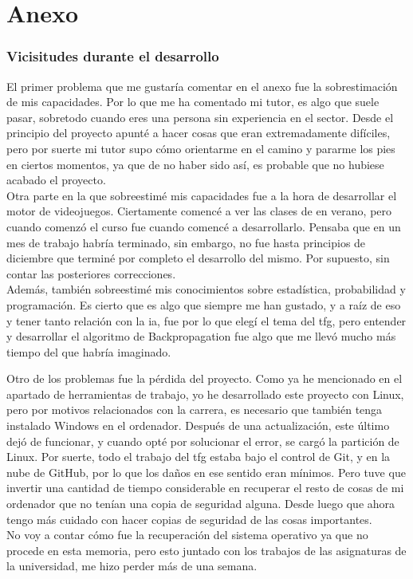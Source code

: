 
\chapter{Anexo}
\subsection{Vicisitudes durante el desarrollo}
El primer problema que me gustaría comentar en el anexo fue la sobrestimación de mis capacidades. Por lo que me ha comentado mi tutor, es algo que suele pasar, sobretodo cuando eres una persona sin experiencia en el sector. Desde el principio del proyecto apunté a hacer cosas que eran extremadamente difíciles, pero por suerte mi tutor supo cómo orientarme en el camino y pararme los pies en ciertos momentos, ya que de no haber sido así, es probable que no hubiese acabado el proyecto. 
\\
Otra parte en la que sobreestimé mis capacidades fue a la hora de desarrollar el motor de videojuegos. Ciertamente comencé a ver las clases de \cite{CursoMotorC++} en verano, pero cuando comenzó el curso fue cuando comencé a desarrollarlo. Pensaba que en un mes de trabajo habría terminado, sin embargo, no fue hasta principios de diciembre que terminé por completo el desarrollo del mismo. Por supuesto, sin contar las posteriores correcciones.
\\
Además, también sobreestimé mis conocimientos sobre estadística, probabilidad y programación. Es cierto que es algo que siempre me han gustado, y a raíz de eso y tener tanto relación con la \gls{ia}, fue por lo que elegí el tema del \gls{tfg}, pero entender y desarrollar el algoritmo de Backpropagation fue algo que me llevó mucho más tiempo del que habría imaginado.

Otro de los problemas fue la pérdida del proyecto. Como ya he mencionado en el apartado de herramientas de trabajo, yo he desarrollado este proyecto con Linux, pero por motivos relacionados con la carrera, es necesario que también tenga instalado Windows en el ordenador. Después de una actualización, este último dejó de funcionar, y cuando opté por solucionar el error, se cargó la partición de Linux. Por suerte, todo el trabajo del \gls{tfg} estaba bajo el control de Git, y en la nube de GitHub, por lo que los daños en ese sentido eran mínimos. Pero tuve que invertir una cantidad de tiempo considerable en recuperar el resto de cosas de mi ordenador que no tenían una copia de seguridad alguna. Desde luego que ahora tengo más cuidado con hacer copias de seguridad de las cosas importantes.
\\
No voy a contar cómo fue la recuperación del sistema operativo ya que no procede en esta memoria, pero esto juntado con los trabajos de las asignaturas de la universidad, me hizo perder más de una semana.

